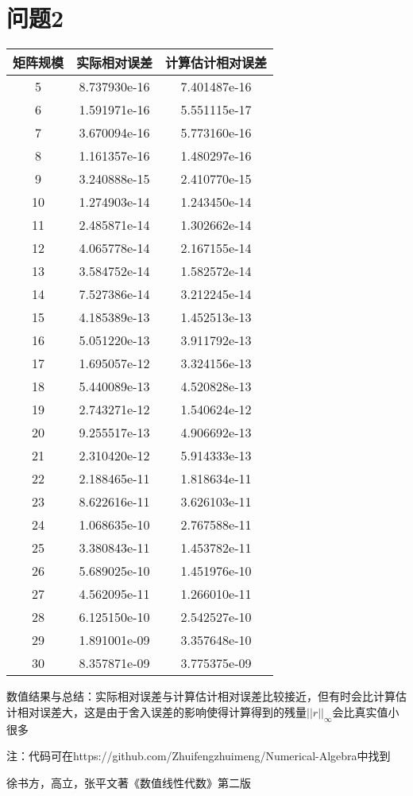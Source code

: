 \documentclass[withoutpreface,bwprint]{cumcmthesis}
\begin{document}
\section{问题2}
\begin{tabular}{|c|c|c|}
\hline
矩阵规模&实际相对误差&计算估计相对误差\\
\hline
5 &8.737930e-16 &7.401487e-16\\
6 &1.591971e-16 &5.551115e-17\\
7 &3.670094e-16 &5.773160e-16\\
8 &1.161357e-16 &1.480297e-16\\
9 &3.240888e-15 &2.410770e-15\\
10 &1.274903e-14 &1.243450e-14\\
11 &2.485871e-14 &1.302662e-14\\
12 &4.065778e-14 &2.167155e-14\\
13 &3.584752e-14 &1.582572e-14\\
14 &7.527386e-14 &3.212245e-14\\
15 &4.185389e-13 &1.452513e-13\\
16 &5.051220e-13 &3.911792e-13\\
17 &1.695057e-12 &3.324156e-13\\
18 &5.440089e-13 &4.520828e-13\\
19 &2.743271e-12 &1.540624e-12\\
20 &9.255517e-13 &4.906692e-13\\
21 &2.310420e-12 &5.914333e-13\\
22 &2.188465e-11 &1.818634e-11\\
23 &8.622616e-11 &3.626103e-11\\
24 &1.068635e-10 &2.767588e-11\\
25 &3.380843e-11 &1.453782e-11\\
26 &5.689025e-10 &1.451976e-10\\
27 &4.562095e-11 &1.266010e-11\\
28 &6.125150e-10 &2.542527e-10\\
29 &1.891001e-09 &3.357648e-10\\
30 &8.357871e-09 &3.775375e-09\\
\hline
\end{tabular}

数值结果与总结：实际相对误差与计算估计相对误差比较接近，但有时会比计算估计相对误差大，这是由于舍入误差的影响使得计算得到的残量$\vert \vert r \vert \vert_{\infty}$会比真实值小很多

注：代码可在https://github.com/Zhuifengzhuimeng/Numerical-Algebra中找到

\begin{thebibliography}{9}%
 徐书方，高立，张平文著《数值线性代数》第二版
\end{thebibliography}
\end{document}
